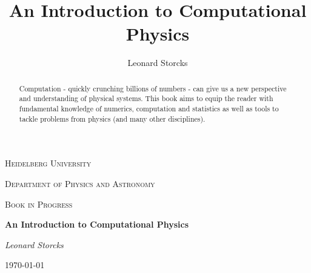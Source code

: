 \documentclass[a4paper, 12pt]{article}
\title{An Introduction to Computational Physics}
\author{Leonard Storcks}
\theoremstyle{definition}
\begin{document}
\begin{titlepage}
	\centering
	{\scshape\LARGE Heidelberg University \par}
	\vspace{0.5cm}
	{\scshape\LARGE Department of Physics and Astronomy \par}
	\vspace{1cm}
	{\scshape\Large Book in Progress\par}
	\vspace{1.5cm}
	{\huge\bfseries An Introduction to \linebreak Computational Physics \par}
	\vspace{2cm}
	{\Large\itshape Leonard Storcks\par}
	\vfill
    \par
	\vfill
\vfill

	{\large \today\par}

\end{titlepage}


\begin{abstract}
Computation - quickly crunching billions of numbers - can give us a new perspective and understanding of physical systems. This book aims to equip the reader with fundamental knowledge of numerics, computation and statistics as well as tools to tackle problems from physics (and many other disciplines).
\end{abstract}

\thispagestyle{empty}

\pagebreak

\thispagestyle{plain}

\tableofcontents
\end{document}
